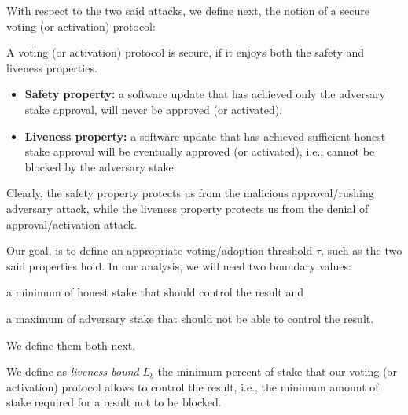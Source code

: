 With respect to the two said attacks, we define next, the notion of a secure 
voting (or activation) protocol:
\begin{definition}
	A voting (or activation) protocol is secure, if it enjoys both the safety 
	and 
	liveness properties.
	
	\begin{itemize}
		\item \textbf{Safety property:} a software update that has achieved 
		only the adversary stake approval, will never be approved (or 
		activated).
		
		\item \textbf{Liveness property:} a software update that has achieved 
		sufficient honest stake approval will be eventually approved (or 
		activated), i.e., cannot be blocked by the adversary stake.
		
	\end{itemize}
	
\end{definition}


Clearly, the safety property protects us from the malicious approval/rushing 
adversary attack, 
while the liveness property protects us from the denial of approval/activation 
attack.

Our goal, is to define an appropriate voting/adoption threshold $\tau$, such 
as the two said properties hold. In our analysis, we will need two boundary 
values: 
\begin{inparaenum}
	\item a minimum of honest stake that should control the result and
	\item a maximum of adversary stake that should not be able to control the 
	result.
\end{inparaenum} We define them both next.

\begin{definition}\label{def:liveness-bound}
	We define as \emph{liveness bound} $L_b$ the minimum percent of  
	stake that our voting (or activation) protocol allows to control the 
	result, 
	i.e., the minimum amount of stake required for a result not to be 
	blocked.
\end{definition}


